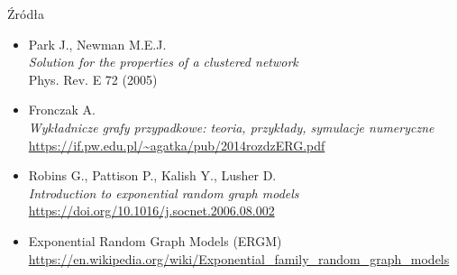 \documentclass{beamer}
\begin{document}
\begin{frame}{Źródła}

\footnotesize

\begin{itemize}

\item Park J., Newman M.E.J.\\
\textit{Solution for the properties of a clustered network}\\
Phys. Rev. E 72 (2005)

\vspace{0.3cm}

\item Fronczak A.\\
\textit{Wykładnicze grafy przypadkowe: teoria, przykłady, symulacje numeryczne}\\
\url{https://if.pw.edu.pl/~agatka/pub/2014rozdzERG.pdf}

\vspace{0.3cm}

\item Robins G., Pattison P., Kalish Y., Lusher D.\\
\textit{Introduction to exponential random graph models}\\
\url{https://doi.org/10.1016/j.socnet.2006.08.002}

\vspace{0.3cm}

\item Exponential Random Graph Models (ERGM)\\
\url{https://en.wikipedia.org/wiki/Exponential_family_random_graph_models}

\end{itemize}

\end{frame}
\end{document}
